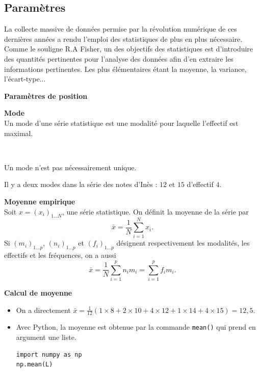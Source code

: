 \documentclass[../PolyS4.tex]{subfiles}
\begin{document}
\subsection{Paramètres}

La collecte massive de données permise par la révolution numérique de ces dernières années a rendu l'emploi des statistiques de plus en plus nécessaire. Comme le souligne R.A Fisher, un des objectifs des statistiques est d'introduire des quantités pertinentes pour l'analyse des données afin d'en extraire les informations pertinentes. Les plus élémentaires étant la moyenne, la variance, l'écart-type...

\newpage

\textbf{Paramètres de position}

\begin{Def}\textbf{Mode}\\

Un mode d'une série statistique est une modalité pour laquelle l'effectif est maximal.
\end{Def}

\begin{Rmq}$\,$

Un mode n'est pas nécessairement unique.
\end{Rmq}

\begin{Ex}
Il y a deux modes dans la série des notes d'Inès : $12$ et $15$ d'effectif $4$.
\end{Ex}

\begin{Def}\textbf{Moyenne empirique}\\

Soit $x = (x_i)_{1 \ldots N}$, une série statistique. On définit la moyenne de la série par
\[
\bar{x} = \frac{1}{N} \sum_{i=1}^{N} x_i.
\]
Si $(m_i)_{1 \ldots p}$, $(n_i)_{1 \ldots p}$ et $(f_i)_{1 \ldots p}$ désignent respectivement les modalités, les effectifs et les fréquences, on a aussi
\[
\bar{x} = \frac{1}{N} \sum_{i=1}^{p} n_i m_i = \sum_{i=1}^{p} f_i m_i.
\]
\end{Def}

\begin{Ex}\textbf{Calcul de moyenne}\\

\begin{itemize}
\item On a directement $\bar{x} = \frac{1}{12} (1 \times 8 + 2 \times 10 + 4 \times 12 + 1 \times 14 + 4 \times 15) = 12,5$.
\item Avec Python, la moyenne est obtenue par la commande \texttt{mean()} qui prend en argument une liste.
\begin{verbatim}
import numpy as np
np.mean(L)
\end{verbatim}
\end{itemize}
\end{Ex}
\end{document}
